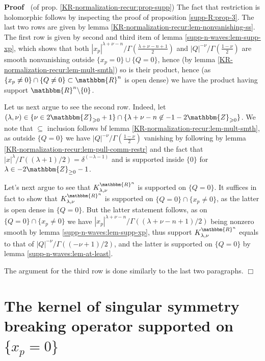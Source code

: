 \documentclass{article}
\newcommand{\comma}{{,}}
\newcommand{\nin}{\not\in}
\newcommand{\upl}{+}
\newenvironment{proof}{\noindent\textbf{Proof\ }}{\hspace*{\fill}$\Box$\medskip}
\numberwithin{definition}{section}
\numberwithin{lemma}{section}
\numberwithin{proposition}{section}
{\theorembodyfont{\rmfamily}\newtheorem{remark}{Remark}
\numberwithin{remark}{section}
}
\begin{document}
\begin{proof}
  (of prop. \ref{KR-normalization-recur:prop-supp}) The fact that restriction
  is holomorphic follows by inspecting the proof of proposition
  \ref{supp-R:prop-3}. The last two rows are given by lemma
  \ref{KR-normalization-recur:lem-nonvanishing-ss}. The first row is given by
  second and third item of lemma \ref{supp-n-waves:lem-supp-xp}, which shows
  that both $| x_p |^{\lambda + \nu - n} / \Gamma \left( \frac{\lambda + \nu -
  n + 1}{2} \right)$ and $| Q |^{- \nu} / \Gamma \left( \frac{1 - \nu}{2}
  \right)$ are smooth nonvanishing outside $\{ x_p = 0 \} \cup \{ Q = 0 \}$,
  hence (by lemma \ref{KR-normalization-recur:lem-mult-smth}) so is their
  product, hence (as $\{ x_p \neq 0 \} \cap \{ Q \neq 0 \} \subset
  \mathbbm{R}^n$ is open dense) we have the product having support
  $\mathbbm{R}^n \backslash \{ 0 \}$.
  
  Let us next argue to see the second row. Indeed, let $( \lambda, \nu) \in \{
  \nu \in 2\mathbbm{Z}_{\geqslant 0} + 1 \} \cap \{ \lambda + \nu - n \nin - 1
  - 2\mathbbm{Z}_{\geqslant 0} \}$. We note that $\subseteq$ inclusion follows
  bf lemma \ref{KR-normalization-recur:lem-mult-smth}, as outside $\{ Q = 0
  \}$ we have $| Q |^{- \nu} / \Gamma \left( \frac{1 - \nu}{2} \right)$
  vanishing by following by lemma
  \ref{KR-normalization-recur:lem-pull-comm-restr} and the fact that $| x
  |^{\lambda} / \Gamma ( ( \lambda + 1) / 2) = \delta^{( - \lambda - 1)}$ and
  is supported inside $\{ 0 \}$ for $\lambda \in -2\mathbbm{Z}_{\ge 0}-1$.
  
  Let's next argue to see that $K_{\lambda, \nu}^{\mathbbm{R}^n}$ is supported
  on $\{ Q = 0 \}$. It suffices in fact to show that $K_{\lambda \comma
  \nu}^{\mathbbm{R}^n}$ is supported on $\{ Q = 0 \} \cap \{ x_p \neq 0 \}$,
  as the latter is open dense in $\{ Q = 0 \}$. But the latter statement
  follows, as on $\{ Q = 0 \} \cap \{ x_p \neq 0 \}$ we have $| x_p |^{\lambda
  + \nu - n} / \Gamma ( ( \lambda \upl \nu - n + 1) / 2)$ being nonzero smooth
  by lemma \ref{supp-n-waves:lem-supp-xp}, thus support $K_{\lambda,
  \nu}^{\mathbbm{R}^n}$ equals to that of $| Q |^{- \nu} / \Gamma ( ( - \nu +
  1) / 2)$, and the latter is supported on $\{ Q = 0 \}$ by lemma
  \ref{supp-n-waves:lem-at-least}.
  
  The argument for the third row is done similarly to the last two paragraphs.
\end{proof}

\section{The kernel of singular symmetry breaking operator supported on $\{
x_p = 0 \}$}\label{sec:supp-P}
\end{document}
